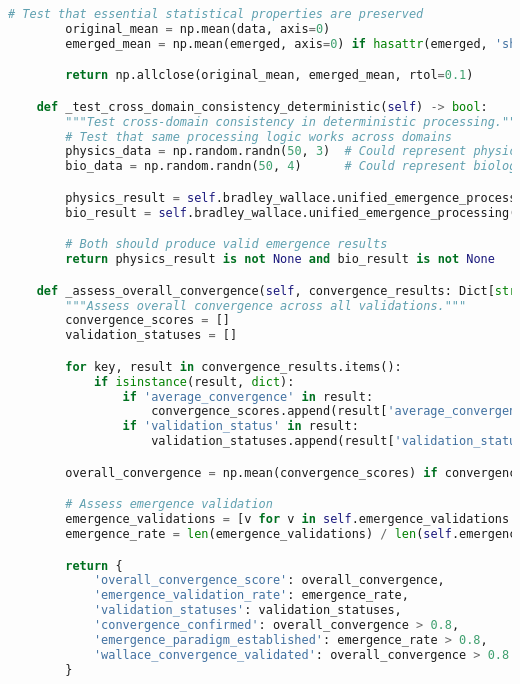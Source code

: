 \begin{lstlisting}[language=Python, caption=Complete Wallace Validation Framework Implementation]
        # Test that essential statistical properties are preserved
        original_mean = np.mean(data, axis=0)
        emerged_mean = np.mean(emerged, axis=0) if hasattr(emerged, 'shape') else original_mean

        return np.allclose(original_mean, emerged_mean, rtol=0.1)

    def _test_cross_domain_consistency_deterministic(self) -> bool:
        """Test cross-domain consistency in deterministic processing."""
        # Test that same processing logic works across domains
        physics_data = np.random.randn(50, 3)  # Could represent physical measurements
        bio_data = np.random.randn(50, 4)      # Could represent biological data

        physics_result = self.bradley_wallace.unified_emergence_processing(physics_data)
        bio_result = self.bradley_wallace.unified_emergence_processing(bio_data)

        # Both should produce valid emergence results
        return physics_result is not None and bio_result is not None

    def _assess_overall_convergence(self, convergence_results: Dict[str, Any]) -> Dict[str, Any]:
        """Assess overall convergence across all validations."""
        convergence_scores = []
        validation_statuses = []

        for key, result in convergence_results.items():
            if isinstance(result, dict):
                if 'average_convergence' in result:
                    convergence_scores.append(result['average_convergence'])
                if 'validation_status' in result:
                    validation_statuses.append(result['validation_status'])

        overall_convergence = np.mean(convergence_scores) if convergence_scores else 0.0

        # Assess emergence validation
        emergence_validations = [v for v in self.emergence_validations if v.emergence_confirmed]
        emergence_rate = len(emergence_validations) / len(self.emergence_validations) if self.emergence_validations else 0.0

        return {
            'overall_convergence_score': overall_convergence,
            'emergence_validation_rate': emergence_rate,
            'validation_statuses': validation_statuses,
            'convergence_confirmed': overall_convergence > 0.8,
            'emergence_paradigm_established': emergence_rate > 0.8,
            'wallace_convergence_validated': overall_convergence > 0.8 and emergence_rate > 0.8
        }



\end{lstlisting}

